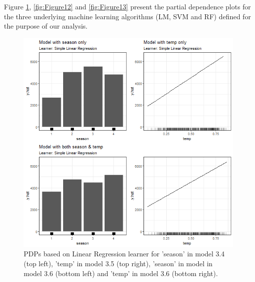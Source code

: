 \documentclass[]{krantz}
\begin{document}
Figure \ref{fig:Figure11}, \ref{fig:Figure12} and \ref{fig:Figure13}
present the partial dependence plots for the three underlying machine
learning algorithms (LM, SVM and RF) defined for the purpose of our
analysis.

\begin{figure}

{\centering \includegraphics[width=0.8\linewidth]{images/VK_PDP_11_Correlated_cat_num_LM} 

}

\caption{PDPs based on Linear Regression learner for 'season' in model 3.4 (top left), 'temp' in model 3.5 (top right), 'season' in model in model 3.6 (bottom left) and 'temp' in model 3.6 (bottom right).}\label{fig:Figure11}
\end{figure}
\end{document}
